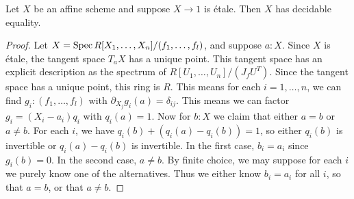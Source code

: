 \begin{proposition}%
	Let $X$ be an affine scheme and suppose $X \to 1$ is étale. Then $X$ has decidable equality.
\end{proposition}

\begin{proof}
	Let $X = \operatorname{Spec} R[X_1,\ldots,X_n]/(f_1,\ldots,f_l)$, and suppose $a : X$.
	Since $X$ is étale, the tangent space $T_a X$ has a unique point.
	This tangent space has an explicit description as the spectrum of 
	$R[U_1,\ldots,U_n]/(J_f U^T)$. Since the tangent space has a unique point,
	this ring is $R$. This means for each $i = 1,\ldots,n$, we can find
	$g_i : (f_1,\ldots,f_l)$ with $\partial_{X_j} g_i(a) = \delta_{ij}$.
	This means we can factor $g_i = (X_i-a_i)q_i$ with $q_i(a) = 1$.
	Now for $b : X$ we claim that either $a = b$ or $a \ne b$.
	For each $i$, we have $q_i(b) + (q_i(a) - q_i(b)) = 1$, so either
	$q_i(b)$ is invertible or $q_i(a) - q_i(b)$ is invertible.
	In the first case, $b_i = a_i$ since $g_i(b) = 0$.
	In the second case, $a \ne b$. 
	By finite choice, we may suppose for each $i$ we purely know one of the alternatives.
	Thus we either know $b_i = a_i$ for all $i$, so that $a = b$, or that $a \ne b$.
\end{proof}

